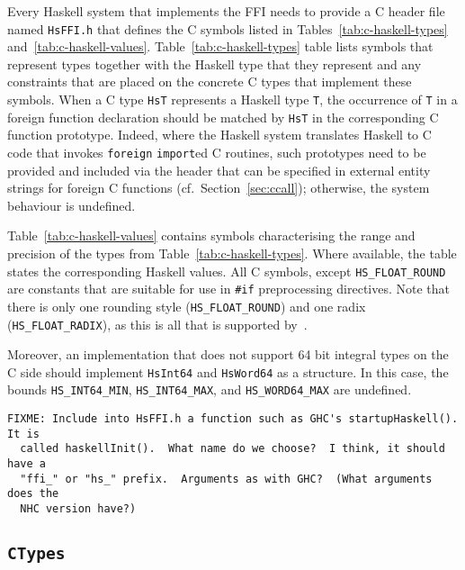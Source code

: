 \documentclass[a4paper,twosides]{article}
\newcommand{\code}[1]{\texttt{#1}}      %
\begin{document}
%
Every Haskell system that implements the FFI needs to provide a C header file
named \code{HsFFI.h} that defines the C symbols listed in
Tables~\ref{tab:c-haskell-types} and~\ref{tab:c-haskell-values}.
Table~\ref{tab:c-haskell-types} table lists symbols that represent types
together with the Haskell type that they represent and any constraints that
are placed on the concrete C types that implement these symbols.  When a C
type \code{HsT} represents a Haskell type \code{T}, the occurrence of \code{T}
in a foreign function declaration should be matched by \code{HsT} in the
corresponding C function prototype.  Indeed, where the Haskell system
translates Haskell to C code that invokes \code{foreign} \code{import}ed C
routines, such prototypes need to be provided and included via the header that
can be specified in external entity strings for foreign C functions (cf.\ 
Section~\ref{sec:ccall}); otherwise, the system behaviour is undefined.

Table~\ref{tab:c-haskell-values} contains symbols characterising the range and
precision of the types from Table~\ref{tab:c-haskell-types}.  Where available,
the table states the corresponding Haskell values.  All C symbols, except
\code{HS\_FLOAT\_ROUND} are constants that are suitable for use in \code{\#if}
preprocessing directives.  Note that there is only one rounding style
(\code{HS\_FLOAT\_ROUND}) and one radix (\code{HS\_FLOAT\_RADIX}), as this is
all that is supported by~\cite{C99}.

Moreover, an implementation that does not support 64 bit integral types on the
C side should implement \code{HsInt64} and \code{HsWord64} as a structure.  In
this case, the bounds \code{HS\_INT64\_MIN}, \code{HS\_INT64\_MAX}, and
\code{HS\_WORD64\_MAX} are undefined.

\begin{verbatim}
FIXME: Include into HsFFI.h a function such as GHC's startupHaskell().  It is
  called haskellInit().  What name do we choose?  I think, it should have a
  "ffi_" or "hs_" prefix.  Arguments as with GHC?  (What arguments does the
  NHC version have?)
\end{verbatim}

\subsection{\code{CTypes}}
\label{sec:CTypes}
\end{document}
